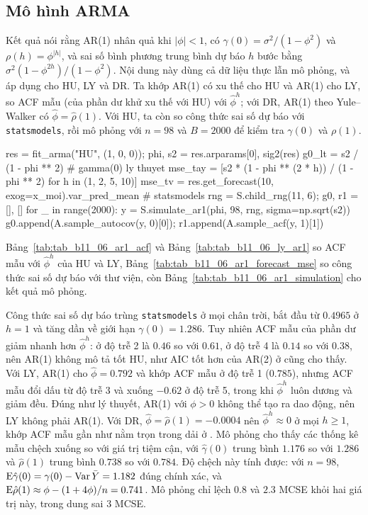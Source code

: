\subsection{Mô hình ARMA}

 Kết quả  nói rằng AR(1) nhân quả khi $|\phi|<1$, có $\gamma(0)=\sigma^2/(1-\phi^2)$ và $\rho(h)=\phi^{|h|}$, và sai số bình phương trung bình dự báo $h$ bước bằng $\sigma^2(1-\phi^{2h})/(1-\phi^2)$.
 Nội dung này dùng cả dữ liệu thực lẫn mô phỏng, và áp dụng cho HU, LY và DR. Ta khớp AR(1) có xu thế cho HU và AR(1) cho LY, so ACF mẫu (của phần dư khử xu thế với HU) với $\hat\phi^h$; với DR, AR(1) theo Yule--Walker có $\hat\phi=\hat\rho(1)$. Với HU, ta còn so công thức sai số dự báo với \texttt{statsmodels}, rồi mô phỏng với $n=98$ và $B=2000$ để kiểm tra $\gamma(0)$ và $\rho(1)$.
\begin{codeblock}
res = fit_arma("HU", (1, 0, 0)); phi, s2 = res.arparams[0], sig2(res)
g0_lt = s2 / (1 - phi ** 2)                                   # gamma(0) ly thuyet
mse_tay = [s2 * (1 - phi ** (2 * h)) / (1 - phi ** 2) for h in (1, 2, 5, 10)]
mse_tv = res.get_forecast(10, exog=x_moi).var_pred_mean       # statsmodels
rng = S.child_rng(11, 6); g0, r1 = [], []
for _ in range(2000):
    y = S.simulate_ar1(phi, 98, rng, sigma=np.sqrt(s2))
    g0.append(A.sample_autocov(y, 0)[0]); r1.append(A.sample_acf(y, 1)[1])
\end{codeblock}
 Bảng~\ref{tab:tab_b11_06_ar1_acf} và Bảng~\ref{tab:tab_b11_06_ly_ar1} so ACF mẫu với $\hat\phi^h$ của HU và LY, Bảng~\ref{tab:tab_b11_06_ar1_forecast_mse} so công thức sai số dự báo với thư viện, còn Bảng~\ref{tab:tab_b11_06_ar1_simulation} cho kết quả mô phỏng.




 Công thức sai số dự báo trùng \texttt{statsmodels} ở mọi chân trời, bắt đầu từ $0.4965$ ở $h=1$ và tăng dần về giới hạn $\gamma(0)=1.286$. Tuy nhiên ACF mẫu của phần dư giảm nhanh hơn $\hat\phi^h$: ở độ trễ 2 là $0.46$ so với $0.61$, ở độ trễ 4 là $0.14$ so với $0.38$, nên AR(1) không mô tả tốt HU, như AIC tốt hơn của AR(2) ở  cũng cho thấy. Với LY, AR(1) cho $\hat\phi=0.792$ và khớp ACF mẫu ở độ trễ 1 ($0.785$), nhưng ACF mẫu đổi dấu từ độ trễ 3 và xuống $-0.62$ ở độ trễ 5, trong khi $\hat\phi^h$ luôn dương và giảm đều. Đúng như lý thuyết, AR(1) với $\phi>0$ không thể tạo ra dao động, nên LY không phải AR(1). Với DR, $\hat\phi=\hat\rho(1)=-0.0004$ nên $\hat\phi^h\approx0$ ở mọi $h\ge1$, khớp ACF mẫu gần như nằm trọn trong dải ở . Mô phỏng cho thấy các thống kê mẫu chệch xuống so với giá trị tiệm cận, với $\hat\gamma(0)$ trung bình $1.176$ so với $1.286$ và $\hat\rho(1)$ trung bình $0.738$ so với $0.784$. Độ chệch này tính được: với $n=98$, $\mathrm{E}\hat\gamma(0)=\gamma(0)-\operatorname{Var}\bar Y=1.182$ đúng chính xác, và $\mathrm{E}\hat\rho(1)\approx\phi-(1+4\phi)/n=0.741$. Mô phỏng chỉ lệch $0.8$ và $2.3$ MCSE khỏi hai giá trị này, trong dung sai $3$ MCSE.

